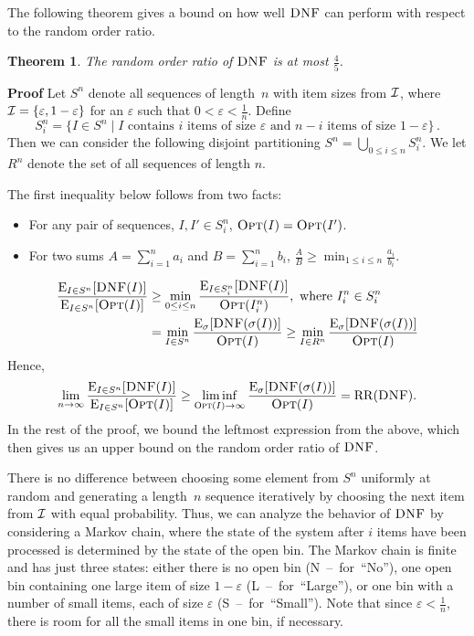 \documentclass[11pt]{article}
\newtheorem{xtheorem}{Theorem}
\newenvironment{theorem}{\begin{xtheorem}\rm}{\end{xtheorem}}
\newenvironment{proof}{\begin{trivlist}\item[]{\bf Proof }}{\hspace*{\fill}\raisebox{-1pt}{\boldmath$\Box$}\end{trivlist}}
\newcommand{\OPT}{\ensuremath{\operatorname{\textsc{Opt}}}\xspace}
\newcommand{\DNF}{\ensuremath{\operatorname{\textsc{DNF}}}\xspace}
\newcommand{\SET}[1]{\left\{#1\right\}}
\newcommand{\SETOF}[2]{\{#1 \mid #2\}}
\newcommand{\EXPDIST}[2]{\ensuremath{\operatorname{E}_{#1}[#2]}}
\newcommand{\RO}[1]{\ensuremath{\mathrm{RR}(#1)}\xspace}
\begin{document}
The following theorem gives a bound on how well \DNF can perform with
respect to the random order ratio.
\begin{theorem}
The random order ratio of \DNF is at most $\frac{4}{5}$.
\end{theorem}
\begin{proof}
Let $S^n$ denote all sequences of length~$n$ with item sizes from ${\cal I}$,
where ${\cal I}=\SET{\varepsilon, 1-\varepsilon}$ for an $\varepsilon$
such that
$0 < \varepsilon < \frac{1}{n}$.
Define
\[S_i^n=\SETOF{I\in S^n}{\mbox{$I$ contains $i$ items of size $\varepsilon$ and $n-i$ items of size $1-\varepsilon$}}\,.\]
Then we can consider the following disjoint partitioning $S^n=\bigcup_{0\leq i\leq n}S_i^n$.
We let $R^n$ denote the set of all sequences of length $n$.

The first inequality below follows from two facts:
\begin{itemize}
\item For any pair of sequences, $I, I' \in S^n_i$, $\OPT(I) = \OPT(I')$.
\item For two sums $A = \sum_{i=1}^n a_i$ and $B = \sum_{i=1}^n b_i$,
  $\frac{A}{B} \geq \min_{1 \leq i \leq n} \frac{a_i}{b_i}$.
\end{itemize}
\begin{align*}
        \frac{\EXPDIST{I \in S^n}{\DNF(I)}}{\EXPDIST{I \in S^n}{\OPT(I)}}
 & \geq \min_{0 \leq i \leq n} 
        \frac{\EXPDIST{I \in S^n_i}{\DNF(I)}}{\OPT(I^n_i)}, 
        \text{ where } I^n_i \in S^n_i\\
 & =    \min_{I \in S^n}
        \frac{\EXPDIST{\sigma}{\DNF(\sigma(I))}}{\OPT(I)} \geq \min_{I \in R^n} 
        \frac{\EXPDIST{\sigma}{\DNF(\sigma(I))}}{\OPT(I)}
\end{align*}
Hence,
\[\lim_{n\rightarrow\infty}\frac{\EXPDIST{I\in S^n}{\DNF(I)}}{\EXPDIST{I\in S^n}{\OPT(I)}}
  \geq
  \liminf_{\OPT(I)\rightarrow\infty}\frac{\EXPDIST{\sigma}{\DNF(\sigma(I))}}{\OPT(I)}
  =
  \RO{\DNF}.\]
In the rest of the proof, we bound the leftmost expression from the above,
which then gives us an upper bound on the random order ratio of \DNF.

There is no difference between choosing some element from $S^n$ uniformly
at random and generating a length~$n$ sequence iteratively by choosing
the next item from ${\cal I}$ with equal probability.
Thus, we can analyze the behavior of \DNF by considering a Markov chain, where the state of the system after $i$ items have been processed is determined by the state of the open bin.
The Markov chain is finite and has just three states: either there is no open bin (N~--~for~``No''), one open bin containing one large item of size $1-\varepsilon$ (L~--~for~``Large''), or one bin with a number of small items, each of size $\varepsilon$ (S~--~for~``Small'').
Note that since $\varepsilon<\frac{1}{n}$, there is room for all the small items in one bin, if necessary.


\end{proof}
\end{document}
